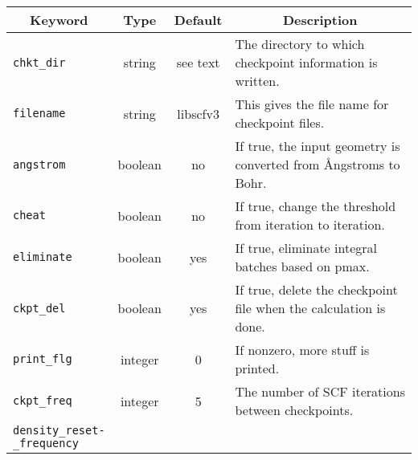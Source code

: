 \begin{table}
\centering
\begin{tabular}{|lccp{2.75in}|}
\hline
\multicolumn{1}{|c}{Keyword} & \multicolumn{1}{c}{Type} &
  \multicolumn{1}{c}{Default} & \multicolumn{1}{c|}{Description} \\
\hline
  {\tt chkt\_dir}         &string &see text& The directory to
                                         which checkpoint information
                                         is written. \\
  {\tt filename}          &string &libscfv3& This gives the file name
                                         for checkpoint files. \\
  {\tt angstrom}          &boolean& no & If true, the input geometry
                                         is converted from \AA ngstroms to
                                         Bohr. \\
  {\tt cheat}             &boolean& no & If true, change the threshold
                                         from iteration to iteration. \\
  {\tt eliminate}         &boolean&yes & If true, eliminate integral batches
                                         based on pmax. \\
  {\tt ckpt\_del}         &boolean&yes & If true, delete the checkpoint file
                                         when the calculation is done. \\
  {\tt print\_flg}        &integer& 0  & If nonzero, more stuff is printed. \\
  {\tt ckpt\_freq}        &integer& 5  & The number of SCF iterations between
                                         checkpoints. \\
 \parbox{1in}
  {\tt density\_reset{\rm -} \\ \_frequency}


\end{tabular}
\end{table}

